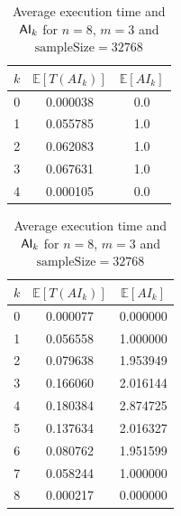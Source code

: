 \documentclass[11pt]{llncs}
\begin{document}
\begin{table}[ht]
    \centering
\begin{minipage}{0.45\textwidth}
    \centering
    \begin{tabular}{|c|c|c|}%
 \hline
        $k$ &  $\mathbb{E}[T(AI_k)]$ &  $\mathbb{E}[AI_k]$ \\ \hline
        0 &               0.000038 &                 0.0 \\ \hline
        1 &               0.055785 &                 1.0 \\ \hline
        2 &               0.062083 &                 1.0 \\\hline
        3 &               0.067631 &                 1.0 \\\hline
        4 &               0.000105 &                 0.0 \\ \hline
    \end{tabular}
    \caption{Average execution time and $\mathsf{AI}_{k}$ for $n=4$, $m=2$}
    \label{table:averagesFullDist}
\end{minipage}
\hfill
\begin{minipage}{0.45\textwidth}
        \centering
        \begin{tabular}{|c|c|c|}%
\hline
 $k$ &  $\mathbb{E}[T(AI_k)]$ &  $\mathbb{E}[AI_k]$ \\ \hline
   0 &               0.000077 &            0.000000 \\ \hline
   1 &               0.056558 &            1.000000 \\ \hline
   2 &               0.079638 &            1.953949 \\ \hline
   3 &               0.166060 &            2.016144 \\ \hline
   4 &               0.180384 &            2.874725 \\ \hline
   5 &               0.137634 &            2.016327 \\ \hline
   6 &               0.080762 &            1.951599 \\ \hline
   7 &               0.058244 &            1.000000 \\ \hline
   8 &               0.000217 &            0.000000 \\ \hline
\end{tabular}
        \caption{Average execution time and $\mathsf{AI}_{k}$ for $n=8$, $m=3$ and $\mbox{sampleSize}=32768$}
        \label{table:averages32768}
    \end{minipage}
\end{table}
\end{document}
